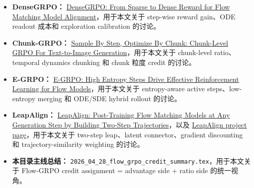 \begin{itemize}[leftmargin=1.5em]
  \item \textbf{DenseGRPO：} \href{https://arxiv.org/abs/2601.20218}{DenseGRPO: From Sparse to Dense Reward for Flow Matching Model Alignment}，用于本文关于 step-wise reward gain、ODE readout 成本和 exploration calibration 的讨论。
  \item \textbf{Chunk-GRPO：} \href{https://arxiv.org/abs/2510.21583}{Sample By Step, Optimize By Chunk: Chunk-Level GRPO For Text-to-Image Generation}，用于本文关于 chunk-level ratio、temporal dynamics chunking 和 chunk 粒度 credit 的讨论。
  \item \textbf{E-GRPO：} \href{https://arxiv.org/abs/2601.00423}{E-GRPO: High Entropy Steps Drive Effective Reinforcement Learning for Flow Models}，用于本文关于 entropy-aware active steps、low-entropy merging 和 ODE/SDE hybrid rollout 的讨论。
  \item \textbf{LeapAlign：} \href{https://arxiv.org/abs/2604.15311}{LeapAlign: Post-Training Flow Matching Models at Any Generation Step by Building Two-Step Trajectories}，以及 \href{https://rockeycoss.github.io/leapalign/}{LeapAlign project page}，用于本文关于 two-step leap、latent connector、gradient discounting 和 trajectory-similarity weighting 的讨论。
  \item \textbf{本目录主线总结：} \texttt{2026\_04\_28\_flow\_grpo\_credit\_summary.tex}，用于本文关于 Flow-GRPO credit assignment = advantage side + ratio side 的统一视角。
\end{itemize}
